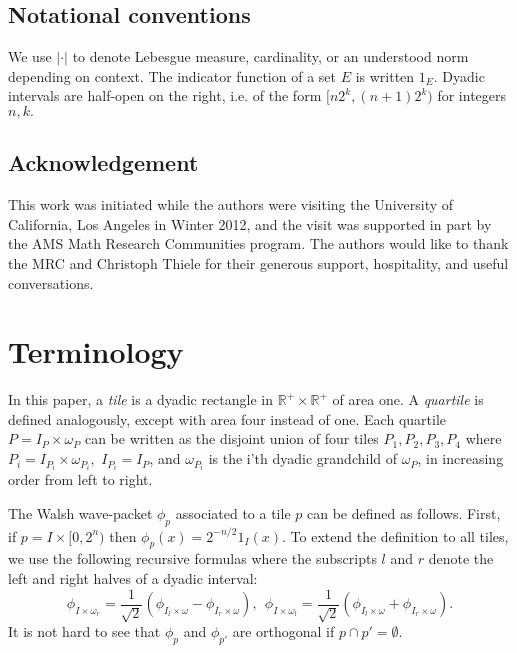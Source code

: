 \documentclass[12pt]{amsart}
\numberwithin{equation}{section}
\newcommand {\rea}{\mathbb{R}}
\begin{document}


\subsection{Notational conventions}
We use $|\cdot|$ to denote Lebesgue measure, cardinality, or an understood norm depending on context. The indicator function of a set $E$ is written $1_E.$ Dyadic intervals are half-open on the right, i.e. of the form $[n2^k, (n+1)2^k)$ for integers $n,k.$

\subsection*{Acknowledgement} This work was initiated while the authors were visiting the University of California, Los Angeles in Winter 2012, and the visit was supported in part by the AMS Math Research Communities program. The authors would like to thank the MRC and Christoph Thiele for their generous support, hospitality, and useful conversations.

\section{Terminology} \label{termsection}

In this paper, a \emph{tile} is a dyadic rectangle in $\rea^+ \times \rea^+$ of area one. A \emph{quartile} is defined analogously, except with area four instead of one. Each quartile $P=I_P \times \omega_P$ can be written as the disjoint union of four tiles $P_1, P_2, P_3, P_4$ where $P_i = I_{P_i} \times \omega_{P_i},$ $I_{P_i} = I_P$, and $\omega_{P_i}$ is the i'th dyadic grandchild of $\omega_P$, in increasing order from left to right. 


The Walsh wave-packet $\phi_p$ associated to a tile $p$ can be defined as follows. First, if $p = I \times [0,2^{n})$ then $\phi_{p}(x) = 2^{-n/2}1_{I}(x).$ To extend the definition to all tiles, we use the following recursive formulas where the subscripts $l$ and $r$ denote the left and right halves of a dyadic interval:
\begin{equation} \label{recursive}
\phi_{I \times \omega_r} = \frac{1}{\sqrt{2}}(\phi_{I_l \times \omega} - \phi_{I_r \times \omega}), \ \ \phi_{I \times \omega_l} = \frac{1}{\sqrt{2}}(\phi_{I_l \times \omega} + \phi_{I_r \times \omega}).
\end{equation}
It is not hard to see that $\phi_p$ and $\phi_{p'}$ are orthogonal if $p \cap p' = \emptyset$.
\end{document}
